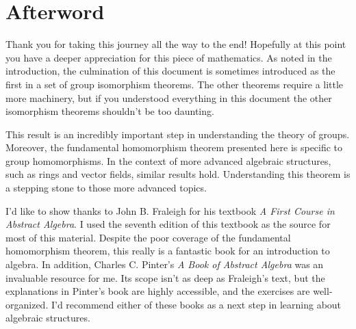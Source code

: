 \pagebreak

\section*{Afterword}
\markright{}

Thank you for taking this journey all the way to the end! Hopefully at this point you have a deeper appreciation for this piece of mathematics. As noted in the introduction, the culmination of this document is sometimes introduced as the first in a set of group isomorphism theorems. The other theorems require a little more machinery, but if you understood everything in this document the other isomorphism theorems shouldn't be too daunting.

This result is an incredibly important step in understanding the theory of groups. Moreover, the fundamental homomorphism theorem presented here is specific to group homomorphisms. In the context of more advanced algebraic structures, such as rings and vector fields, similar results hold. Understanding this theorem is a stepping stone to those more advanced topics.

I'd like to show thanks to John B. Fraleigh for his textbook \textit{A First Course in Abstract Algebra}. I used the seventh edition of this textbook as the source for most of this material. Despite the poor coverage of the fundamental homomorphism theorem, this really is a fantastic book for an introduction to algebra. In addition, Charles C. Pinter's \textit{A Book of Abstract Algebra} was an invaluable resource for me. Its scope isn't as deep as Fraleigh's text, but the explanations in Pinter's book are highly accessible, and the exercises are well-organized. I'd recommend either of these books as a next step in learning about algebraic structures.